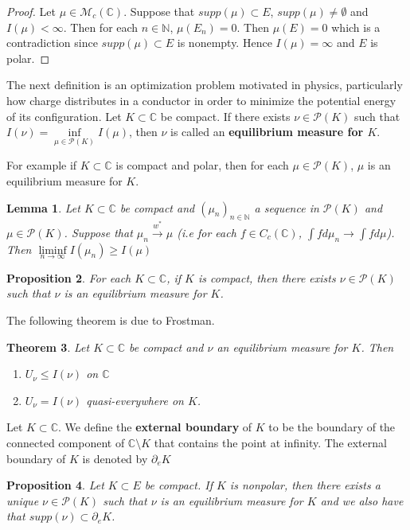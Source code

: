 \documentclass[12pt]{amsart}
\newtheorem{thm}{Theorem}[subsection]
\newtheorem{lem}[thm]{Lemma}
\newtheorem{prop}[thm]{Proposition}
\theoremstyle{definition}
\theoremstyle{remark}
\theoremstyle{definition}
\newcommand{\N}{\mathbb{N}}
\newcommand{\C}{\mathbb{C}}
\newcommand{\MCM}{\mathcal{M}}
\newcommand{\MCP}{\mathcal{P}}
\begin{document}
\begin{proof}
Let $\mu \in \MCM_c(\C)$. Suppose that $supp(\mu) \subset E$, $supp(\mu) \neq \emptyset$ and $I(\mu) < \infty$. Then for each $n \in \N$, $\mu(E_n) = 0$. Then $\mu(E) = 0$ which is a contradiction since $supp(\mu) \subset E$ is nonempty. Hence $I(\mu) = \infty$ and $E$ is polar.
\end{proof}
 
The next definition is an optimization problem motivated in physics, particularly how charge distributes in a conductor in order to minimize the potential energy of its configuration. 
Let $K \subset \C$ be compact. If there exists $\nu \in \MCP(K)$ such that $I(\nu) = \inf\limits_{\mu \in \MCP(K)}I(\mu)$, then $\nu$ is called an \textbf{equilibrium measure for $K$}.

For example if $K \subset \C$ is compact and polar, then for each $\mu \in \MCP(K)$, $\mu$ is an equilibrium measure for $K$.
 
\begin{lem}
Let $K \subset \C$ be compact and $(\mu_n)_{n \in \N}$ a sequence in $\MCP(K)$ and $\mu \in \MCP(K)$. Suppose that $\mu_n \overset{w^*}{\rightarrow} \mu$ (i.e for each $f \in C_c(\C)$, $\int f d\mu_{n} \rightarrow \int f d\mu$). Then $\liminf\limits_{n\rightarrow \infty}I(\mu_n) \geq I(\mu)$ 
\end{lem} 
 
\begin{prop}
For each $K \subset \C$, if $K$ is compact, then there exists $\nu \in \MCP(K)$ such that $\nu$ is an equilibrium measure for $K$.
\end{prop}

The following theorem is due to Frostman. 
 
\begin{thm}
Let $K \subset \C$ be compact and $\nu$ an equilibrium measure for $K$. Then 
\begin{enumerate}
\item $U_{\nu} \leq I(\nu)$ on $\C$
\item $U_{\nu} = I(\nu)$ quasi-everywhere on $K$. 
\end{enumerate}
\end{thm}

Let $K \subset \C$. We define the \textbf{external boundary} of $K$ to be the boundary of the connected component of $\C \setminus K$ that contains the point at infinity. The external boundary of $K$ is denoted by $\partial_eK$

\begin{prop}
Let $K \subset E$ be compact. If $K$ is nonpolar, then there exists a unique $\nu \in \MCP(K)$ such that $\nu$ is an equilibrium measure for $K$ and we also have that $supp(\nu) \subset \partial_eK$. 
\end{prop}
 
\end{document}
